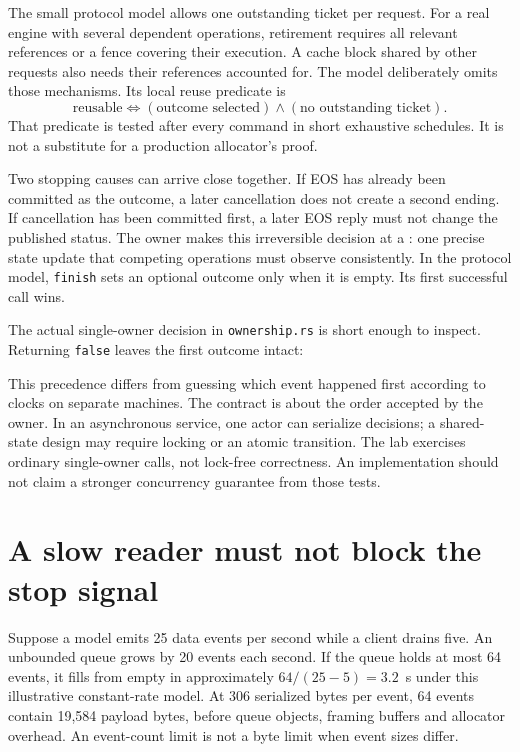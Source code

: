 The small protocol model allows one outstanding ticket per request. For a
real engine with several dependent operations, retirement requires all
relevant references or a fence covering their execution. A cache block
shared by other requests also needs their references accounted for.
The model deliberately omits those mechanisms. Its local reuse predicate is
\begin{equation}
\text{reusable} \iff
  (\text{outcome selected})\land(\text{no outstanding ticket}).
\end{equation}
That predicate is tested after every command in short exhaustive schedules.
It is not a substitute for a production allocator's proof.

Two stopping causes can arrive close together. If EOS has already been
committed as the outcome, a later cancellation does not create a second
ending. If cancellation has been committed first, a later EOS reply must
not change the published status. The owner makes this irreversible decision
at a : one precise state update that competing
operations must observe consistently. In the protocol model,
\texttt{finish} sets an optional outcome only when it is empty.
Its first successful call wins.

\begin{minipage}{\linewidth}
The actual single-owner decision in \texttt{ownership.rs} is short enough
to inspect. Returning \texttt{false} leaves the first outcome intact:
\end{minipage}

This precedence differs from guessing which event happened first according
to clocks on separate machines. The contract is about the order accepted by
the owner. In an asynchronous service, one actor can serialize decisions;
a shared-state design may require locking or an atomic transition.
The lab exercises ordinary single-owner calls, not lock-free correctness.
An implementation should not claim a stronger concurrency guarantee from
those tests.

\section{A slow reader must not block the stop signal}
Suppose a model emits 25 data events per second while a client drains five.
An unbounded queue grows by 20 events each second. If the queue holds at
most 64 events, it fills from empty in approximately
$64/(25-5)=3.2$~s under this illustrative constant-rate model.
At 306 serialized bytes per event, 64 events contain 19,584 payload bytes,
before queue objects, framing buffers and allocator overhead.
An event-count limit is not a byte limit when event sizes differ.

